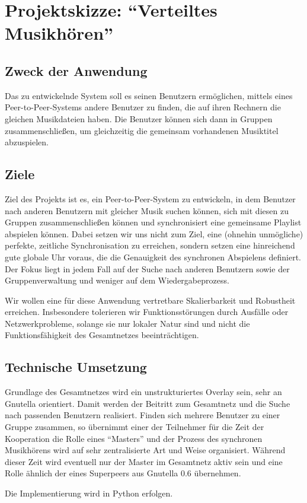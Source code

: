 \documentclass[11pt,a4paper]{article}
\begin{document}

\section*{Projektskizze: "`Verteiltes Musikhören"'}
\subsection*{Zweck der Anwendung}
Das zu entwickelnde System soll es seinen Benutzern ermöglichen, mittels eines Peer-to-Peer-Systems andere Benutzer zu finden, die auf ihren Rechnern die gleichen Musikdateien haben. Die Benutzer können sich dann in Gruppen zusammenschließen, um gleichzeitig die gemeinsam vorhandenen Musiktitel abzuspielen.

\subsection*{Ziele}
Ziel des Projekts ist es, ein Peer-to-Peer-System zu entwickeln, in dem Benutzer nach anderen Benutzern mit gleicher Musik suchen können, sich mit diesen zu Gruppen zusammenschließen können und synchronisiert eine gemeinsame Playlist abspielen können. Dabei setzen wir uns nicht zum Ziel, eine (ohnehin unmögliche) perfekte, zeitliche Synchronisation zu erreichen, sondern setzen eine hinreichend gute globale Uhr voraus, die die Genauigkeit des synchronen Abspielens definiert. Der Fokus liegt in jedem Fall auf der Suche nach anderen Benutzern sowie der Gruppenverwaltung und weniger auf dem Wiedergabeprozess.

Wir wollen eine für diese Anwendung vertretbare Skalierbarkeit und Robustheit erreichen. Insbesondere tolerieren wir Funktionsstörungen durch Ausfälle oder Netzwerkprobleme, solange sie nur lokaler Natur sind und nicht die Funktionsfähigkeit des Gesamtnetzes beeinträchtigen.

\subsection*{Technische Umsetzung}
Grundlage des Gesamtnetzes wird ein unstrukturiertes Overlay sein, sehr an Gnutella orientiert. Damit werden der Beitritt zum Gesamtnetz und die Suche nach passenden Benutzern realisiert. Finden sich mehrere Benutzer zu einer Gruppe zusammen, so übernimmt einer der Teilnehmer für die Zeit der Kooperation die Rolle eines "`Masters"' und der Prozess des synchronen Musikhörens wird auf sehr zentralisierte Art und Weise organisiert. Während dieser Zeit wird eventuell nur der Master im Gesamtnetz aktiv sein und eine Rolle ähnlich der eines Superpeers aus Gnutella 0.6 übernehmen.

Die Implementierung wird in Python erfolgen.
\end{document}
